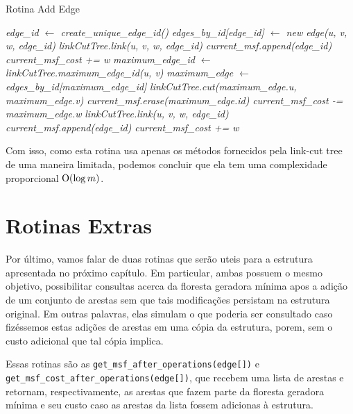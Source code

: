 \begin{algorithm}[h!]
    \caption{Rotina Add Edge}\label{imsf-add-edge}
    \begin{algorithmic}
        \State \emph{edge\_id $\gets$ create\_unique\_edge\_id()}
        \State \emph{edges\_by\_id[edge\_id] $\gets$ new edge(u, v, w, edge\_id)}
        \State \emph{linkCutTree.link(u, v, w, edge\_id)}
        \State \emph{current\_msf.append(edge\_id)}
        \State \emph{current\_msf\_cost += w}
        \State \emph{maximum\_edge\_id $\gets$ linkCutTree.maximum\_edge\_id(u, v)}
        \State \emph{maximum\_edge $\gets$ edges\_by\_id[maximum\_edge\_id]}
        \State \emph{linkCutTree.cut(maximum\_edge.u, maximum\_edge.v)}
        \State \emph{current\_msf.erase(maximum\_edge.id)}
        \State \emph{current\_msf\_cost -= maximum\_edge.w}
        \State \emph{linkCutTree.link(u, v, w, edge\_id)}
        \State \emph{current\_msf.append(edge\_id)}
        \State \emph{current\_msf\_cost += w}
        \EndIf
        \EndFunction
    \end{algorithmic}
\end{algorithm}

Com isso, como esta rotina usa apenas os métodos fornecidos pela link-cut tree de uma maneira limitada, podemos concluir que ela tem uma complexidade proporcional $\mathrm{O}(\log m)$.

\section{Rotinas Extras}
\label{sec:imsf-extras}

Por último, vamos falar de duas rotinas que serão uteis para a estrutura apresentada no próximo capítulo. Em particular, ambas possuem o mesmo objetivo, possibilitar consultas acerca da floresta geradora mínima apos a adição de um conjunto de arestas sem que tais modificações persistam na estrutura original. Em outras palavras, elas simulam o que poderia ser consultado caso fizéssemos estas adições de arestas em uma cópia da estrutura, porem, sem o custo adicional que tal cópia implica.

Essas rotinas são as \texttt{get\_msf\_after\_operations(edge[])} e \\ \texttt{get\_msf\_cost\_after\_operations(edge[])}, que recebem uma lista de arestas e retornam, respectivamente, as arestas que fazem parte da floresta geradora mínima e seu custo caso as arestas da lista fossem adicionas à estrutura.

